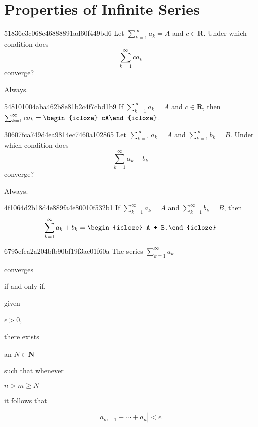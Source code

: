 


\section{Properties of Infinite Series} %
\begin{note}{51836e3c068e46888891ad60f449bd6}
    Let \({ \sum_{k=1}^{\infty} a_k = A }\) and \({ c \in \mathbf{R} }\).
    Under which condition does
    \[
        \sum_{k=1}^{\infty} ca_k
    \]
    converge?

    \begin{cloze}{1}
        Always.
    \end{cloze}
\end{note}

\begin{note}{548101004aba462b8e81b2c4f7cbd1b9}
    If \({ \sum_{k=1}^{\infty} a_k = A }\) and \({ c \in \mathbf{R} }\), then \({ \sum_{k=1}^{\infty} ca_k = \begin{icloze}{1}cA\end{icloze} }\).
\end{note}

\begin{note}{30607fca749d4ea9814ec7460a102865}
    Let \({ \sum_{k=1}^{\infty} a_k = A }\) and \({ \sum_{k=1}^{\infty} b_k = B }\).
    Under which condition does
    \[
        \sum_{k=1}^{\infty} a_k + b_k
    \]
    converge?

    \begin{cloze}{1}
        Always.
    \end{cloze}
\end{note}

\begin{note}{4f1064d2b18d4e889fa4e80010f532b1}
    If \({ \sum_{k=1}^{\infty} a_k = A }\) and \({ \sum_{k=1}^{\infty} b_k = B }\), then
    \[
        \sum_{k=1}^{\infty} a_k + b_k = \begin{icloze}{1}A + B.\end{icloze}
    \]
\end{note}

\begin{note}{6795efea2a204bfb90bf19f3ac01f60a}
    The series \({ \sum_{k=1}^{\infty} a_k }\) \begin{icloze}{5}converges\end{icloze} \begin{icloze}{4}if and only if,\end{icloze} given \begin{icloze}{3}\({ \epsilon > 0 }\),\end{icloze} there exists \begin{icloze}{2}an \({ N \in \mathbf{N} }\)\end{icloze} such that whenever \begin{icloze}{2}\({ n > m \geq N }\)\end{icloze} it follows that
    \begin{icloze}{1}
        \[
            \left\lvert a_{m + 1} + \cdots + a_n \right\rvert < \epsilon.
        \]
    \end{icloze}
\end{note}

